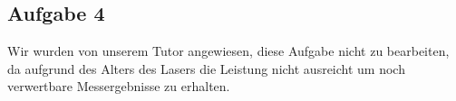 \subsection{Aufgabe 4}

Wir wurden von unserem Tutor angewiesen, diese Aufgabe nicht zu bearbeiten, da aufgrund des Alters des Lasers die Leistung nicht ausreicht um noch verwertbare Messergebnisse zu erhalten.